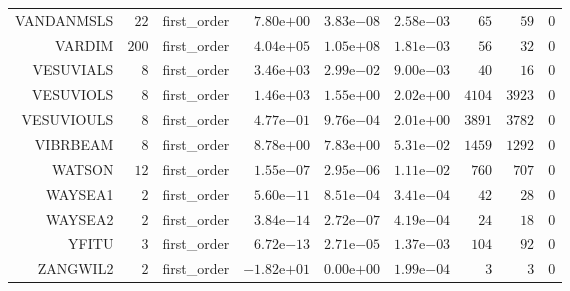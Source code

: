 \begin{longtable}{rrrrrrrrr}
VANDANMSLS & \(    22\) & first\_order & \( 7.80\)e\(+00\) & \( 3.83\)e\(-08\) & \( 2.58\)e\(-03\) & \(    65\) & \(    59\) & \(     0\) \\
VARDIM & \(   200\) & first\_order & \( 4.04\)e\(+05\) & \( 1.05\)e\(+08\) & \( 1.81\)e\(-03\) & \(    56\) & \(    32\) & \(     0\) \\
VESUVIALS & \(     8\) & first\_order & \( 3.46\)e\(+03\) & \( 2.99\)e\(-02\) & \( 9.00\)e\(-03\) & \(    40\) & \(    16\) & \(     0\) \\
VESUVIOLS & \(     8\) & first\_order & \( 1.46\)e\(+03\) & \( 1.55\)e\(+00\) & \( 2.02\)e\(+00\) & \(  4104\) & \(  3923\) & \(     0\) \\
VESUVIOULS & \(     8\) & first\_order & \( 4.77\)e\(-01\) & \( 9.76\)e\(-04\) & \( 2.01\)e\(+00\) & \(  3891\) & \(  3782\) & \(     0\) \\
VIBRBEAM & \(     8\) & first\_order & \( 8.78\)e\(+00\) & \( 7.83\)e\(+00\) & \( 5.31\)e\(-02\) & \(  1459\) & \(  1292\) & \(     0\) \\
WATSON & \(    12\) & first\_order & \( 1.55\)e\(-07\) & \( 2.95\)e\(-06\) & \( 1.11\)e\(-02\) & \(   760\) & \(   707\) & \(     0\) \\
WAYSEA1 & \(     2\) & first\_order & \( 5.60\)e\(-11\) & \( 8.51\)e\(-04\) & \( 3.41\)e\(-04\) & \(    42\) & \(    28\) & \(     0\) \\
WAYSEA2 & \(     2\) & first\_order & \( 3.84\)e\(-14\) & \( 2.72\)e\(-07\) & \( 4.19\)e\(-04\) & \(    24\) & \(    18\) & \(     0\) \\
YFITU & \(     3\) & first\_order & \( 6.72\)e\(-13\) & \( 2.71\)e\(-05\) & \( 1.37\)e\(-03\) & \(   104\) & \(    92\) & \(     0\) \\
ZANGWIL2 & \(     2\) & first\_order & \(-1.82\)e\(+01\) & \( 0.00\)e\(+00\) & \( 1.99\)e\(-04\) & \(     3\) & \(     3\) & \(     0\) \\\hline
\end{longtable}
